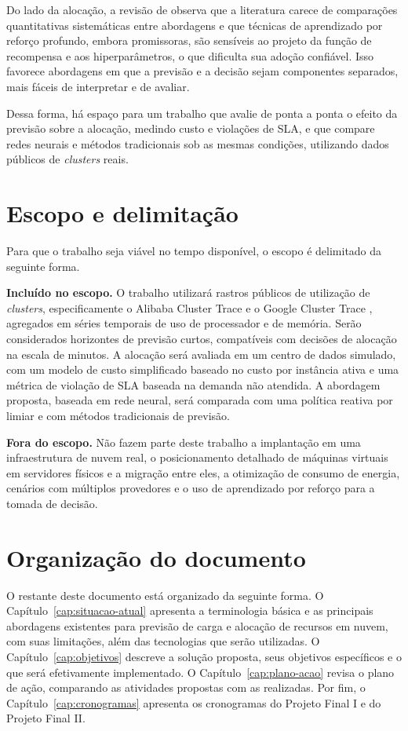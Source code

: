 Do lado da alocação, a revisão de  observa que a literatura carece de comparações quantitativas sistemáticas entre abordagens e que técnicas de aprendizado por reforço profundo, embora promissoras, são sensíveis ao projeto da função de recompensa e aos hiperparâmetros, o que dificulta sua adoção confiável. Isso favorece abordagens em que a previsão e a decisão sejam componentes separados, mais fáceis de interpretar e de avaliar.

Dessa forma, há espaço para um trabalho que avalie de ponta a ponta o efeito da previsão sobre a alocação, medindo custo e violações de SLA, e que compare redes neurais e métodos tradicionais sob as mesmas condições, utilizando dados públicos de \textit{clusters} reais.

\section{Escopo e delimitação}
\label{sec:escopo}

Para que o trabalho seja viável no tempo disponível, o escopo é delimitado da seguinte forma.

\textbf{Incluído no escopo.} O trabalho utilizará rastros públicos de utilização de \textit{clusters}, especificamente o Alibaba Cluster Trace \cite{alibaba2018trace} e o Google Cluster Trace \cite{wilkes2020google}, agregados em séries temporais de uso de processador e de memória. Serão considerados horizontes de previsão curtos, compatíveis com decisões de alocação na escala de minutos. A alocação será avaliada em um centro de dados simulado, com um modelo de custo simplificado baseado no custo por instância ativa e uma métrica de violação de SLA baseada na demanda não atendida. A abordagem proposta, baseada em rede neural, será comparada com uma política reativa por limiar e com métodos tradicionais de previsão.

\textbf{Fora do escopo.} Não fazem parte deste trabalho a implantação em uma infraestrutura de nuvem real, o posicionamento detalhado de máquinas virtuais em servidores físicos e a migração entre eles, a otimização de consumo de energia, cenários com múltiplos provedores e o uso de aprendizado por reforço para a tomada de decisão.

\section{Organização do documento}
\label{sec:organizacao}

O restante deste documento está organizado da seguinte forma. O Capítulo~\ref{cap:situacao-atual} apresenta a terminologia básica e as principais abordagens existentes para previsão de carga e alocação de recursos em nuvem, com suas limitações, além das tecnologias que serão utilizadas. O Capítulo~\ref{cap:objetivos} descreve a solução proposta, seus objetivos específicos e o que será efetivamente implementado. O Capítulo~\ref{cap:plano-acao} revisa o plano de ação, comparando as atividades propostas com as realizadas. Por fim, o Capítulo~\ref{cap:cronogramas} apresenta os cronogramas do Projeto Final I e do Projeto Final II.